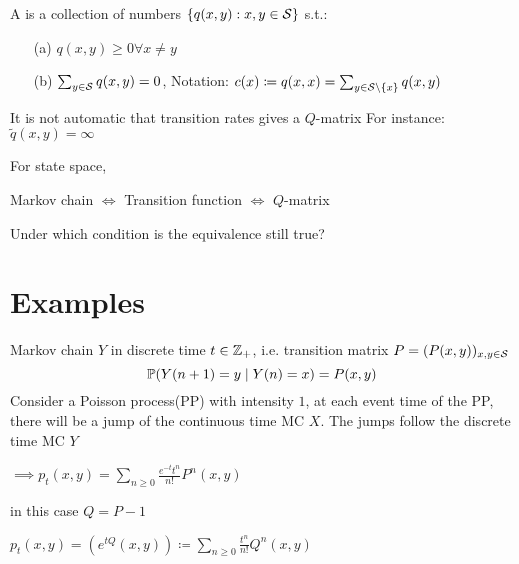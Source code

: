 \begin{definition}
    A  is a collection of numbers \(\{q(x,y):x,y\in\mathcal{S}\}\) s.t.:
    \begin{enumerate}
        \item[(a)] \(q(x,y)\geq 0\forall x\neq y\)
        \item[(b)] \(\sum_{y\in\mathcal{S}} q(x,y)=0\), Notation: \(c(x)\coloneqq q(x,x)=\sum_{y\in\mathcal{S}\setminus\{x\}} q(x,y)\)   
    \end{enumerate}
\end{definition}

\begin{tcolorbox}[enhanced,breakable,
	title=Warning,colback=red!20!white]
    It is not automatic that transition rates gives a \(Q\)-matrix
    For instance: \(\tilde{q}(x,y)=\infty\)
\end{tcolorbox}

For  state space,
    
Markov chain \(\iff\) Transition function \(\iff\) \(Q\)-matrix


 Under which condition is the equivalence still true? 

\section{Examples}

\begin{example*}
     Markov chain \(Y\) in discrete time \(t\in\mathbb{Z}_+\), i.e. transition matrix \(P=(P(x,y))_{x,y\in\mathcal{S}}\)
    \[\mathbb{P}(Y(n+1)=y\mid Y(n)=x)=P(x,y)\]
    Consider a Poisson process(PP) with intensity \(1\), at each event time of the PP, there will be a jump of the 
    continuous time MC \(X\). The jumps follow the discrete time MC \(Y\)

    \(\implies p_t(x,y)=\sum_{n\geq 0}\frac{e^{-t}t^n}{n!}P^n(x,y)\)

    in this case \(Q=P-1\)
\end{example*}

\begin{example*}[Finite $\cS$]
    \(p_t(x,y)=\left(e^{tQ}(x,y)\right)\coloneqq \sum_{n\geq 0}\frac{t^n}{n!}Q^n(x,y)\) 
\end{example*}

